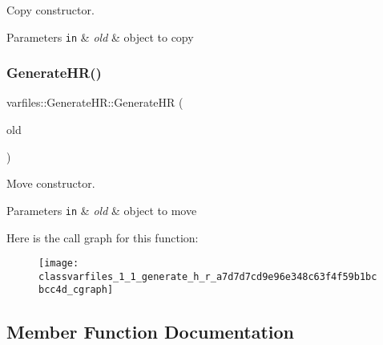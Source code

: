 Copy constructor. 


\begin{DoxyParams}[1]{Parameters}
\mbox{\tt in}  & {\em old} & object to copy \\
\hline
\end{DoxyParams}
\mbox{\label{classvarfiles_1_1_generate_h_r_a7d7d7cd9e96e348c63f4f59b1bcbcc4d}} 
\subsubsection{\texorpdfstring{Generate\+H\+R()}{GenerateHR()}\hspace{0.1cm}{\footnotesize\ttfamily [2/2]}}
{\footnotesize\ttfamily varfiles\+::\+Generate\+H\+R\+::\+Generate\+HR (\begin{DoxyParamCaption}\item[{\hyperlink{classvarfiles_1_1_generate_h_r}{Generate\+HR} \&\&}]{old }\end{DoxyParamCaption})\hspace{0.3cm}{\ttfamily [inline]}}



Move constructor. 


\begin{DoxyParams}[1]{Parameters}
\mbox{\tt in}  & {\em old} & object to move \\
\hline
\end{DoxyParams}
Here is the call graph for this function\+:\nopagebreak
\begin{figure}[H]
\begin{center}
\leavevmode
\texttt{[image: classvarfiles\_1\_1\_generate\_h\_r\_a7d7d7cd9e96e348c63f4f59b1bcbcc4d\_cgraph]}
\end{center}
\end{figure}


\subsection{Member Function Documentation}
\mbox{\label{classvarfiles_1_1_generate_h_r_a065b4553f2dcc37d8a123725200ef5c7}} 
